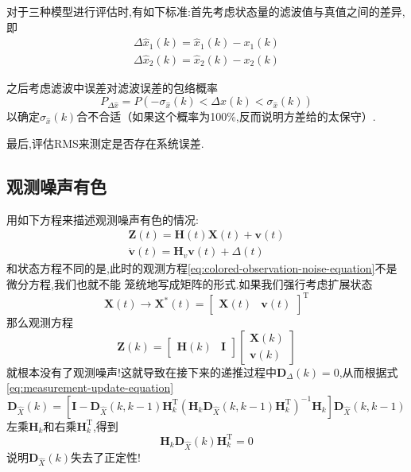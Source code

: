 \documentclass[cn,10pt,citestyle=gb7714-2015,bibstyle=gb7714-2015]{elegantbook}
\newcommand{\mT}{\mathrm{T}}
\begin{document}
\begin{note}
  对于三种模型进行评估时,有如下标准:首先考虑状态量的滤波值与真值之间的差异,即
  \begin{gather*}
    \Delta\hat{x}_1(k)=\hat{x}_1(k)-x_1(k)\\
    \Delta\hat{x}_2(k)=\hat{x}_2(k)-x_2(k)
  \end{gather*}
  
  之后考虑滤波中误差对滤波误差的包络概率
  \[
    P_{\Delta\hat{x}}=P\left(-\sigma_{\hat{x}}(k)<\Delta\hat{x}(k)<\sigma_{\hat{x}}(k)\right)
  \]
  以确定$\sigma_{\hat{x}}(k)$合不合适（如果这个概率为100\%,反而说明方差给的太保守）.

  最后,评估RMS来测定是否存在系统误差.
\end{note}
\subsection{观测噪声有色}
用如下方程来描述观测噪声有色的情况:
\begin{gather}
  \bm{Z}(t)=\bm{H}(t)\bm{X}(t)+\bm{v}(t)\label{eq:colored-observation-noise-equation}\\
  \dot{\bm{v}}(t)=\bm{H}_v\bm{v}(t)+\bm{\varDelta}(t)\label{eq:colored-observation-noise}
\end{gather}
和状态方程不同的是,此时的观测方程\eqref{eq:colored-observation-noise-equation}不是微分方程,我们也就不能
笼统地写成矩阵的形式.如果我们强行考虑扩展状态
\[
  \bm{X}(t)\longrightarrow\bm{X}^*(t)=\begin{bmatrix}
    \bm{X}(t)&\bm{v}(t)
  \end{bmatrix}^\mT
\]
那么观测方程
\[
  \bm{Z}(k)=\begin{bmatrix}
    \bm{H}(k)&\bm{I}
  \end{bmatrix}\begin{bmatrix}
    \bm{X}(k)\\
    \bm{v}(k)
  \end{bmatrix}
\]
就根本没有了观测噪声!这就导致在接下来的递推过程中$\bm{D}_\varDelta(k)=0$,从而根据式\eqref{eq:measurement-update-equation}
\[
  \bm{D}_{\hat{X}}(k)=\left[\bm{I}-\bm{D}_{\hat{X}}(k,k-1)\bm{H}_k^\mT\left(\bm{H}_k\bm{D}_{\hat{X}}(k,k-1)\bm{H}_k^\mT\right)^{-1}\bm{H}_k\right]\bm{D}_{\hat{X}}(k,k-1)
\]
左乘$\bm{H}_k$和右乘$\bm{H}_k^\mT$,得到
\[
  \bm{H}_k\bm{D}_{\hat{X}}(k)\bm{H}_k^\mT=0
\]
说明$\bm{D}_{\hat{X}}(k)$失去了正定性!
\end{document}
